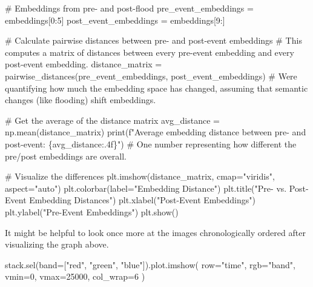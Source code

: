 \documentclass[
  letterpaper,
  DIV=11,
  numbers=noendperiod]{scrreprt}
\newenvironment{Shaded}{\begin{snugshade}}{\end{snugshade}}
\newcommand{\BuiltInTok}[1]{\textcolor[rgb]{0.00,0.23,0.31}{#1}}
\newcommand{\CommentTok}[1]{\textcolor[rgb]{0.37,0.37,0.37}{#1}}
\newcommand{\DecValTok}[1]{\textcolor[rgb]{0.68,0.00,0.00}{#1}}
\newcommand{\NormalTok}[1]{\textcolor[rgb]{0.00,0.23,0.31}{#1}}
\newcommand{\OperatorTok}[1]{\textcolor[rgb]{0.37,0.37,0.37}{#1}}
\newcommand{\SpecialCharTok}[1]{\textcolor[rgb]{0.37,0.37,0.37}{#1}}
\newcommand{\SpecialStringTok}[1]{\textcolor[rgb]{0.13,0.47,0.30}{#1}}
\newcommand{\StringTok}[1]{\textcolor[rgb]{0.13,0.47,0.30}{#1}}
\begin{document}
\begin{Shaded}
\begin{Highlighting}[]
\CommentTok{\# Embeddings from pre{-} and post{-}flood}
\NormalTok{pre\_event\_embeddings }\OperatorTok{=}\NormalTok{ embeddings[}\DecValTok{0}\NormalTok{:}\DecValTok{5}\NormalTok{]}
\NormalTok{post\_event\_embeddings }\OperatorTok{=}\NormalTok{ embeddings[}\DecValTok{9}\NormalTok{:]}

\CommentTok{\# Calculate pairwise distances between pre{-} and post{-}event embeddings}
\CommentTok{\# This computes a matrix of distances between every pre{-}event embedding and every post{-}event embedding.}
\NormalTok{distance\_matrix }\OperatorTok{=}\NormalTok{ pairwise\_distances(pre\_event\_embeddings, post\_event\_embeddings)}
\CommentTok{\# We\textquotesingle{}re quantifying how much the embedding space has changed, assuming that semantic changes (like flooding) shift embeddings.}

\CommentTok{\# Get the average of the distance matrix}
\NormalTok{avg\_distance }\OperatorTok{=}\NormalTok{ np.mean(distance\_matrix)}
\BuiltInTok{print}\NormalTok{(}\SpecialStringTok{f"Average embedding distance between pre{-} and post{-}event: }\SpecialCharTok{\{}\NormalTok{avg\_distance}\SpecialCharTok{:.4f\}}\SpecialStringTok{"}\NormalTok{)}
\CommentTok{\# One number representing how different the pre/post embeddings are overall.}

\CommentTok{\# Visualize the differences}
\NormalTok{plt.imshow(distance\_matrix, cmap}\OperatorTok{=}\StringTok{"viridis"}\NormalTok{, aspect}\OperatorTok{=}\StringTok{"auto"}\NormalTok{)}
\NormalTok{plt.colorbar(label}\OperatorTok{=}\StringTok{"Embedding Distance"}\NormalTok{)}
\NormalTok{plt.title(}\StringTok{"Pre{-} vs. Post{-}Event Embedding Distances"}\NormalTok{)}
\NormalTok{plt.xlabel(}\StringTok{"Post{-}Event Embeddings"}\NormalTok{)}
\NormalTok{plt.ylabel(}\StringTok{"Pre{-}Event Embeddings"}\NormalTok{)}
\NormalTok{plt.show()}
\end{Highlighting}
\end{Shaded}

It might be helpful to look once more at the images chronologically
ordered after visualizing the graph above.

\begin{Shaded}
\begin{Highlighting}[]
\NormalTok{stack.sel(band}\OperatorTok{=}\NormalTok{[}\StringTok{"red"}\NormalTok{, }\StringTok{"green"}\NormalTok{, }\StringTok{"blue"}\NormalTok{]).plot.imshow(}
\NormalTok{    row}\OperatorTok{=}\StringTok{"time"}\NormalTok{, rgb}\OperatorTok{=}\StringTok{"band"}\NormalTok{, vmin}\OperatorTok{=}\DecValTok{0}\NormalTok{, vmax}\OperatorTok{=}\DecValTok{25000}\NormalTok{, col\_wrap}\OperatorTok{=}\DecValTok{6}
\NormalTok{)}
\end{Highlighting}
\end{Shaded}
\end{document}

